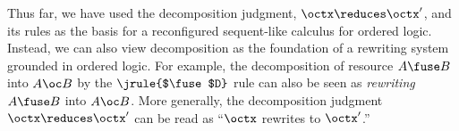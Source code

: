 Thus far, we have used the decomposition judgment, $\octx \reduces \octx'$, and its rules as the basis for a reconfigured sequent-like calculus for ordered logic.
% 
Instead,
we can also view decomposition as the foundation of a rewriting system grounded in ordered logic.
For example, the decomposition of resource $A \fuse B$ into $A \oc B$ by the $\jrule{$\fuse$D}$ rule
can also be seen as \emph{rewriting} $A \fuse B$ into $A \oc B$.
More generally, the decomposition judgment $\octx \reduces \octx'$ can be read as \enquote{$\octx$ rewrites to $\octx'$.}

